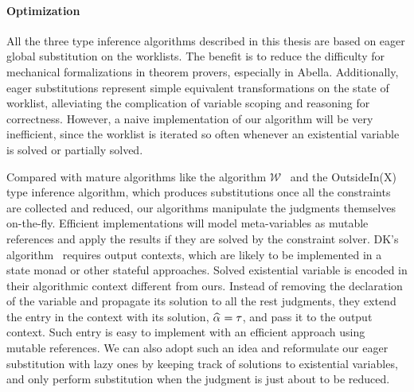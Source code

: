 
\paragraph{Optimization}

All the three type inference algorithms described
in this thesis are based on eager global substitution on the worklists.
The benefit is to reduce the difficulty for mechanical formalizations
in theorem provers, especially in Abella.
Additionally, eager substitutions represent simple equivalent transformations
on the state of worklist,
alleviating the complication of variable scoping and reasoning for correctness.
However, a naive implementation of our algorithm will be very inefficient,
since the worklist is iterated so often
whenever an existential variable is solved or partially solved.

Compared with mature algorithms like the algorithm $\mathcal{W}$~\citep{milner1978theory}
and the OutsideIn(X)~\citep{outsidein} type inference algorithm,
which produces substitutions once all the constraints are collected and reduced,
our algorithms manipulate the judgments themselves on-the-fly.
Efficient implementations will model meta-variables as mutable references
and apply the results if they are solved by the constraint solver.
DK's algorithm~\citep{dunfield2013complete} requires output contexts,
which are likely to be implemented in a state monad or other stateful approaches.
Solved existential variable is encoded in their algorithmic context different from ours.
Instead of removing the declaration of the variable and propagate its solution to
all the rest judgments, they extend the entry in the context with its solution,
$\al = \tau$, and pass it to the output context.
Such entry is easy to implement with an efficient approach using mutable references.
We can also adopt such an idea and reformulate our eager substitution with
lazy ones by keeping track of solutions to existential variables,
and only perform substitution when the judgment is just about to be reduced.

